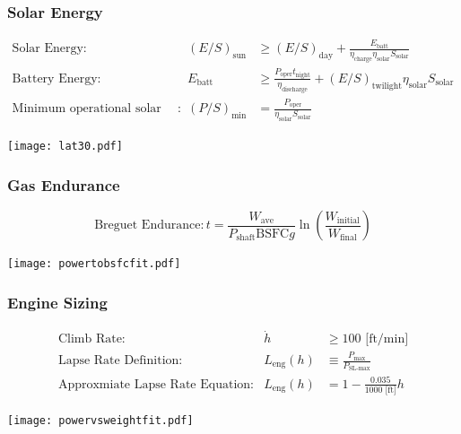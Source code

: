\documentclass{beamer}
\begin{document}
\begin{frame}
    \frametitle{Solar Energy}

    \scriptsize
    \[ \begin{array}{rrl}
        \text{Solar Energy} : & (E/S)_{\text{sun}}  &\geq (E/S)_{\text{day}} + \frac{E_{\text{batt}}}{\eta_{\text{charge}}\eta_{\text{solar}} S_{\text{solar}}} \\
        \text{Battery Energy} : &E_{\text{batt}} &\geq \frac{P_{\text{oper}}t_{\text{night}}}{\eta_{\text{discharge}}} + (E/S)_{\text{twilight}} \eta_{\text{solar}} S_{\text{solar}} \\
        \text{Minimum operational solar power} : & (P/S)_{\text{min}} &= \frac{P_{\text{oper}}}{\eta_{\text{solar}} S_{\text{solar}}} 
    \end{array} \]

    \begin{center}
    \texttt{[image: lat30.pdf]}
    \end{center}
\end{frame}

\begin{frame}
    \frametitle{Gas Endurance}

    \[ \text{Breguet Endurance}: t = \frac{W_{\text{ave}}}{P_{\text{shaft}}\text{BSFC}g} \ln{\left( \frac{W_{\text{initial}}}{W_{\text{final}}}\right)} \]
        
    \begin{center}
    \texttt{[image: powertobsfcfit.pdf]}
    \end{center}

\end{frame}
        
\begin{frame}
    \frametitle{Engine Sizing}

    \scriptsize
    \[ \begin{array}{rrl}
            \text{Climb Rate}: & \dot{h} &\geq 100 \text{ [ft/min]} \\
            \text{Lapse Rate Definition}: &L_{\text{eng}}(h) &\equiv \frac{P_{\text{max}}}{P_{\text{SL-max}}} \\
            \text{Approxmiate Lapse Rate Equation}: & L_{\text{eng}}(h) &= 1 - \frac{0.035}{1000 \text{ [ft]}} h
    \end{array} \]

    \begin{center}
    \texttt{[image: powervsweightfit.pdf]}
    \end{center}

\end{frame}
\end{document}
